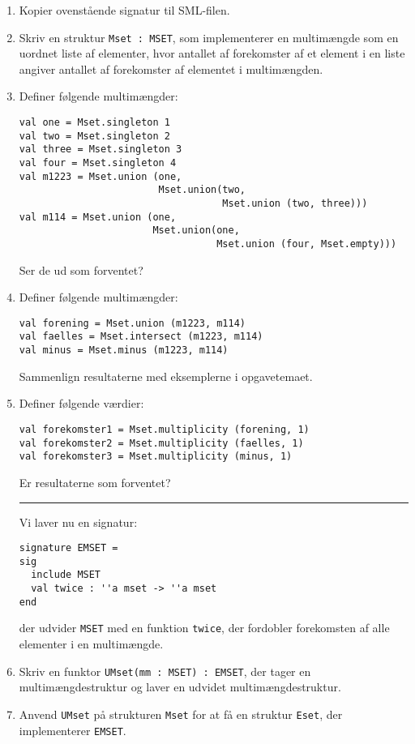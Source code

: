 \documentclass[a4paper,12pt]{article}
\begin{document}
\begin{enumerate}[{7G}1]

\item Kopier ovenstående signatur til SML-filen.

\item Skriv en struktur \texttt{Mset : MSET}, som implementerer en
  multimængde som en uordnet liste af elementer, hvor antallet af
  forekomster af et element i en liste angiver antallet af forekomster
  af elementet i multimængden.

\item Definer følgende multimængder:

\begin{lstlisting}
val one = Mset.singleton 1
val two = Mset.singleton 2
val three = Mset.singleton 3
val four = Mset.singleton 4
val m1223 = Mset.union (one,
                        Mset.union(two,
                                   Mset.union (two, three)))
val m114 = Mset.union (one,
                       Mset.union(one,
                                  Mset.union (four, Mset.empty)))
\end{lstlisting}

Ser de ud som forventet?

\item Definer følgende multimængder:

\begin{lstlisting}
val forening = Mset.union (m1223, m114)
val faelles = Mset.intersect (m1223, m114)
val minus = Mset.minus (m1223, m114)
\end{lstlisting}

Sammenlign resultaterne med eksemplerne i opgavetemaet.

\item Definer følgende værdier:

\begin{lstlisting}
val forekomster1 = Mset.multiplicity (forening, 1)
val forekomster2 = Mset.multiplicity (faelles, 1)
val forekomster3 = Mset.multiplicity (minus, 1)
\end{lstlisting}

Er resultaterne som forventet?
\vspace{1ex}

\hrule

\newpage

Vi laver nu en signatur:

\begin{Verbatim}
signature EMSET =
sig
  include MSET
  val twice : ''a mset -> ''a mset
end
\end{Verbatim}

der udvider \texttt{MSET} med en funktion \texttt{twice}, der
fordobler forekomsten af alle elementer i en multimængde.

\item Skriv en funktor \texttt{UMset(mm : MSET) : EMSET}, der tager en
  multimængdestruktur og laver en udvidet multimængdestruktur.

\item Anvend \texttt{UMset} på strukturen \texttt{Mset} for at få en
  struktur \texttt{Eset}, der implementerer \texttt{EMSET}.

\end{enumerate}
\end{document}
